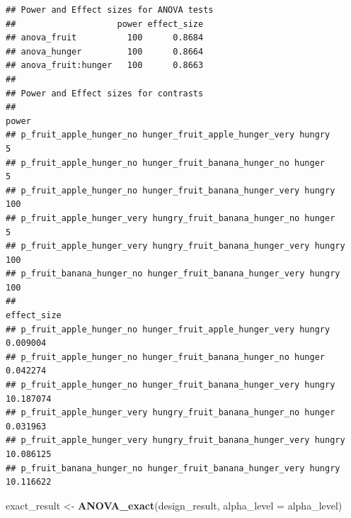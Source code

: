 \documentclass[]{book}
\newenvironment{Shaded}{\begin{snugshade}}{\end{snugshade}}
\newcommand{\DataTypeTok}[1]{\textcolor[rgb]{0.13,0.29,0.53}{#1}}
\newcommand{\KeywordTok}[1]{\textcolor[rgb]{0.13,0.29,0.53}{\textbf{#1}}}
\newcommand{\NormalTok}[1]{#1}
\newcommand{\StringTok}[1]{\textcolor[rgb]{0.31,0.60,0.02}{#1}}
\begin{document}
\begin{verbatim}
## Power and Effect sizes for ANOVA tests
##                    power effect_size
## anova_fruit          100      0.8684
## anova_hunger         100      0.8664
## anova_fruit:hunger   100      0.8663
## 
## Power and Effect sizes for contrasts
##                                                                  power
## p_fruit_apple_hunger_no hunger_fruit_apple_hunger_very hungry        5
## p_fruit_apple_hunger_no hunger_fruit_banana_hunger_no hunger         5
## p_fruit_apple_hunger_no hunger_fruit_banana_hunger_very hungry     100
## p_fruit_apple_hunger_very hungry_fruit_banana_hunger_no hunger       5
## p_fruit_apple_hunger_very hungry_fruit_banana_hunger_very hungry   100
## p_fruit_banana_hunger_no hunger_fruit_banana_hunger_very hungry    100
##                                                                  effect_size
## p_fruit_apple_hunger_no hunger_fruit_apple_hunger_very hungry       0.009004
## p_fruit_apple_hunger_no hunger_fruit_banana_hunger_no hunger        0.042274
## p_fruit_apple_hunger_no hunger_fruit_banana_hunger_very hungry     10.187074
## p_fruit_apple_hunger_very hungry_fruit_banana_hunger_no hunger      0.031963
## p_fruit_apple_hunger_very hungry_fruit_banana_hunger_very hungry   10.086125
## p_fruit_banana_hunger_no hunger_fruit_banana_hunger_very hungry    10.116622
\end{verbatim}

\begin{Shaded}
\begin{Highlighting}[]
\NormalTok{exact_result <-}\StringTok{ }\KeywordTok{ANOVA_exact}\NormalTok{(design_result, }\DataTypeTok{alpha_level =}\NormalTok{ alpha_level)}
\end{Highlighting}
\end{Shaded}
\end{document}
